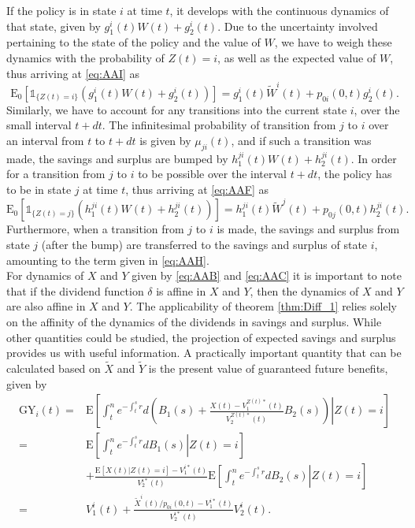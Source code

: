 \documentclass[12pt]{article}
\newcommand{\E}{\text{E}}
\newcommand{\indic}[1]{\mathds{1}_{ \{ #1 \} }}
\theoremstyle{my_thm}
\begin{document}
If the policy is in state $i$ at time $t$, it develops with the continuous dynamics of that state, given by $g^i_1(t)W(t)+g_2^i(t)$. Due to the uncertainty involved pertaining to the state of the policy and the value of $W$, we have to weigh these dynamics with the probability of $Z(t)=i$, as well as the expected value of $W$, thus arriving at \eqref{eq:AAI} as
$$
\E_0 [\indic{Z(t)=i} \left(g^i_1(t)W(t)+g_2^i(t)\right)]= g_1^i(t)\tilde{W}^i(t)+p_{0i}(0,t)g_2^i(t).
$$
Similarly, we have to account for any transitions into the current state $i$, over the small interval $t+dt$. The infinitesimal probability of transition from $j$ to $i$ over an interval from $t$ to $t+dt$ is given by $\mu_{ji}(t)$, and if such a transition was made, the savings and surplus are bumped by $h^{ji}_1(t)W(t)+h^{ji}_2(t)$. In order for a transition from $j$ to $i$ to be possible over the interval $t+dt$, the policy has to be in state $j$ at time $t$, thus arriving at 
\eqref{eq:AAF} as
$$
\E_0[ \indic{Z(t)=j} \left( h_1^{ji}(t)W(t)+ h_2^{ji}(t)\right)]= h_1^{ji}(t)\tilde{W}^j(t)+ p_{0j}(0,t)h_2^{ji}(t).
$$
Furthermore, when a transition from $j$ to $i$ is made, the savings and surplus from state $j$ (after the bump) are transferred to the savings and surplus of state $i$, amounting to the term given in \eqref{eq:AAH}. 
\\[12pt]
For dynamics of $X$ and $Y$ given by \eqref{eq:AAB} and \eqref{eq:AAC} it is important to note that if the dividend function $\delta$ is affine in $X$ and $Y$, then the dynamics of $X$ and $Y$ are also affine in $X$ and $Y$. The applicability of theorem \ref{thm:Diff_1} relies solely on the affinity of the dynamics of the dividends in savings and surplus. While other quantities could be studied, the projection of expected savings and surplus provides us with useful information. A practically important quantity that can be calculated based on $\tilde{X}$ and $\tilde{Y}$ is the present value of guaranteed future benefits, given by
\begin{align*}
\text{GY}_i(t)=&\E \left. \left[ \int_t^n e^{-\int_t^s r} d \left( B_1(s)+\frac{X(t)-V_1^{Z(t)*}(t)}{V_2^{Z(t)*}(t)}B_2(s) \right) \right| Z(t)=i\right]
\\
=&
\E \left[ \left. \int_t^n e^{-\int_t^s r} d B_1(s) \right| Z(t)=i \right]
\\
&+ \frac{\E[X(t)|Z(t)=i]-V_1^{i*}(t)}{V_2^{i*}(t)}  \E \left. \left[ \int_t^n e^{-\int_t^s r} dB_2(s) \right| Z(t)=i\right]
\\
=&
V_1^i(t)+\frac{\tilde{X}^{i}(t)/p_{0i}(0,t)-V_1^{i*}(t)}{V_2^{i*}(t)}V_2^i(t).
\end{align*}
\end{document}
